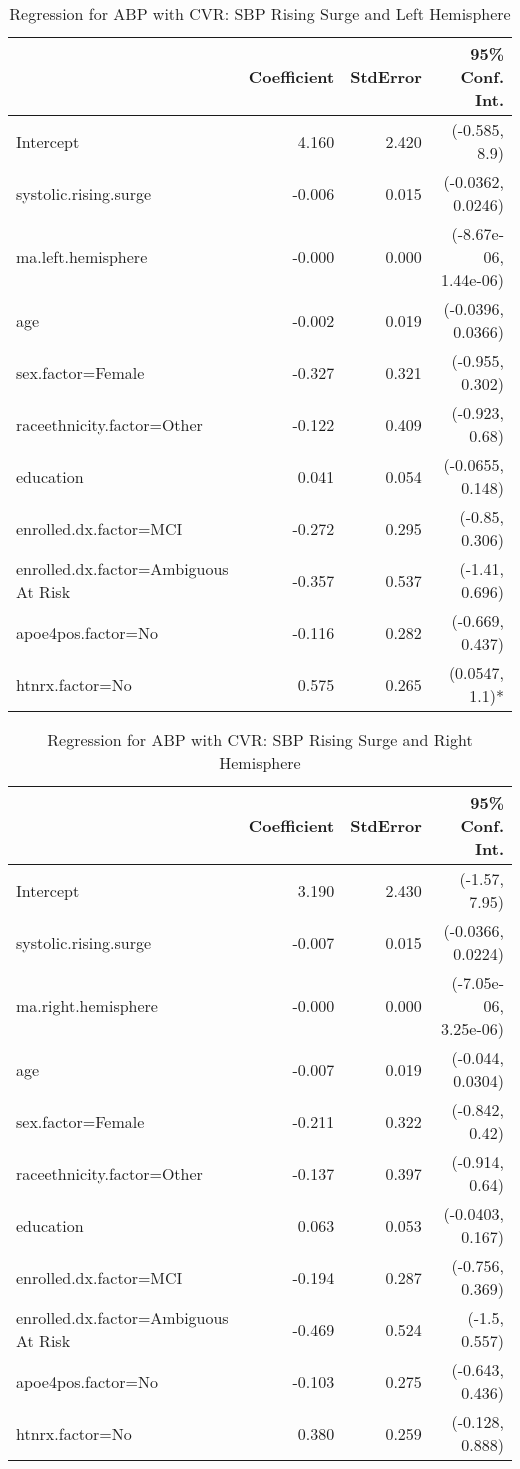 \documentclass[10pt]{article}\usepackage[]{graphicx}\usepackage[]{color}
\begin{document}
\begin{table}[ht]
\centering
\caption{Regression for ABP with CVR: SBP Rising Surge and Left Hemisphere} 
\begin{tabular}{lrrr}
  \toprule
 & Coefficient & StdError & 95\% Conf. Int. \\ 
  \midrule
Intercept & 4.160 & 2.420 & (-0.585, 8.9) \\ 
  systolic.rising.surge & -0.006 & 0.015 & (-0.0362, 0.0246) \\ 
  ma.left.hemisphere & -0.000 & 0.000 & (-8.67e-06, 1.44e-06) \\ 
  age & -0.002 & 0.019 & (-0.0396, 0.0366) \\ 
  sex.factor=Female & -0.327 & 0.321 & (-0.955, 0.302) \\ 
  raceethnicity.factor=Other & -0.122 & 0.409 & (-0.923, 0.68) \\ 
  education & 0.041 & 0.054 & (-0.0655, 0.148) \\ 
  enrolled.dx.factor=MCI & -0.272 & 0.295 & (-0.85, 0.306) \\ 
  enrolled.dx.factor=Ambiguous At Risk & -0.357 & 0.537 & (-1.41, 0.696) \\ 
  apoe4pos.factor=No & -0.116 & 0.282 & (-0.669, 0.437) \\ 
  htnrx.factor=No & 0.575 & 0.265 & (0.0547, 1.1)* \\ 
   \bottomrule
\end{tabular}
\end{table}
\begin{table}[ht]
\centering
\caption{Regression for ABP with CVR: SBP Rising Surge and Right Hemisphere} 
\begin{tabular}{lrrr}
  \toprule
 & Coefficient & StdError & 95\% Conf. Int. \\ 
  \midrule
Intercept & 3.190 & 2.430 & (-1.57, 7.95) \\ 
  systolic.rising.surge & -0.007 & 0.015 & (-0.0366, 0.0224) \\ 
  ma.right.hemisphere & -0.000 & 0.000 & (-7.05e-06, 3.25e-06) \\ 
  age & -0.007 & 0.019 & (-0.044, 0.0304) \\ 
  sex.factor=Female & -0.211 & 0.322 & (-0.842, 0.42) \\ 
  raceethnicity.factor=Other & -0.137 & 0.397 & (-0.914, 0.64) \\ 
  education & 0.063 & 0.053 & (-0.0403, 0.167) \\ 
  enrolled.dx.factor=MCI & -0.194 & 0.287 & (-0.756, 0.369) \\ 
  enrolled.dx.factor=Ambiguous At Risk & -0.469 & 0.524 & (-1.5, 0.557) \\ 
  apoe4pos.factor=No & -0.103 & 0.275 & (-0.643, 0.436) \\ 
  htnrx.factor=No & 0.380 & 0.259 & (-0.128, 0.888) \\ 
   \bottomrule
\end{tabular}
\end{table}
\end{document}
